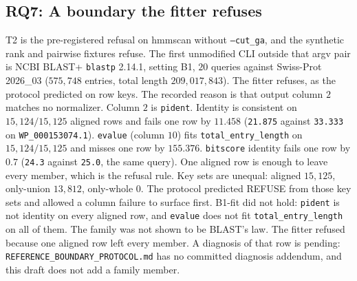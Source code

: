 \documentclass[letterpaper,twocolumn,10pt]{article}
\begin{document}
\subsection{RQ7: A boundary the fitter refuses}
\label{sec:rq7}

T2 is the pre-registered refusal on hmmscan without \texttt{--cut\_ga}, and the synthetic rank and pairwise fixtures refuse.
The first unmodified CLI outside that argv pair is NCBI BLAST+ \texttt{blastp} 2.14.1, setting B1, $20$ queries against Swiss-Prot 2026\_03
($575{,}748$ entries, total length $209{,}017{,}843$).
The fitter refuses, as the protocol predicted on row keys.
The recorded reason is that output column $2$ matches no normalizer.
Column $2$ is \texttt{pident}.
Identity is consistent on
$15{,}124/15{,}125$
aligned rows and fails one row by
$11.458$
(\texttt{21.875} against \texttt{33.333} on \texttt{WP\_000153074.1}).
\texttt{evalue} (column $10$) fits \texttt{total\_entry\_length} on
$15{,}124/15{,}125$
and misses one row by
$155.376$.
\texttt{bitscore} identity fails one row by
$0.7$
(\texttt{24.3} against \texttt{25.0}, the same query).
One aligned row is enough to leave every member, which is the refusal rule.
Key sets are unequal: aligned
$15{,}125$,
only-union
$13{,}812$,
only-whole
$0$.
The protocol predicted REFUSE from those key sets and allowed a column failure to surface first.
B1-fit did not hold: \texttt{pident} is not identity on every aligned row, and \texttt{evalue} does not fit \texttt{total\_entry\_length} on all of them.
The family was not shown to be BLAST's law.
The fitter refused because one aligned row left every member.
A diagnosis of that row is pending: \texttt{REFERENCE\_BOUNDARY\_PROTOCOL.md} has no committed diagnosis addendum, and this draft does not add a family member.
\end{document}
